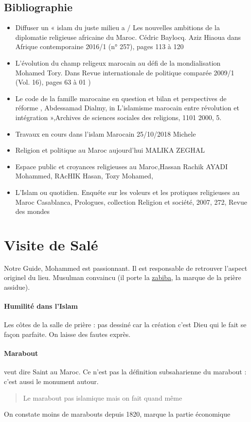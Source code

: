 \subsection{Bibliographie}
\begin{itemize}
    \item  Diffuser un « islam du juste milieu a / Les nouvelles ambitions de la diplomatie religieuse africaine du Maroc. Cédric Baylocq. Aziz Hiaoua dans Afrique contemporaine 2016/1 (n° 257), pages 113 à 120 
        \item  L'évolution du champ religeux marocain au défi de la mondialisation Mohamed Tory. Dans Revue internationale de politique comparée 2009/1 (Vol. 16), pages 63 à 01
)     \item  Le code de la famille marocaine en question et bilan et perspectives de réforme , Abdessamad Dialmy, in L'islamisme marocain entre révolution et intégration »,Archives de sciences sociales des religions, 1101 2000, 5.   \item   Travaux en cours dans l'islam Marocain 25/10/2018 Michele     \item   Religion et politique au Maroc aujourd'hui MALIKA ZEGHAL     \item  Espace public et croyances religieuses au Maroc,Hassan Rachik AYADI Mohammed, RAcHIK Hasan, Tozy Mohamed,     \item  L'Islam ou quotidien.
Enquéte sur les voleurs et les protiques religieuses au Maroc Casablanca, Prologues, collection  Religion et société, 2007, 272, Revue des mondes 

\end{itemize}



\section{Visite de Salé}

Notre Guide, Mohammed est passionnant. Il est responsable de retrouver l'aspect originel du lieu. Musulman convaincu (il porte la \href{https://fr.wikipedia.org/wiki/Zabiba}{zabiba}, la marque de la prière assidue).
\paragraph{Humilité dans l'Islam} Les côtes de la salle de prière : pas dessiné car la création c’est Dieu qui le fait se façon parfaite. On laisse des fautes exprès.

\paragraph{Marabout} veut dire Saint au Maroc. Ce n'est pas la définition subsaharienne du marabout : c'est aussi le monument autour.
\begin{quote}
    Le marabout pas islamique mais on fait quand même 
\end{quote} 
On constate moins de marabouts depuis 1820,  marque la partie économique 

